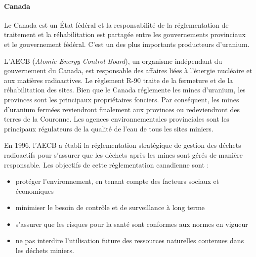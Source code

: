 \documentclass{article}
\begin{document}




\paragraph{Canada}

Le Canada est un État fédéral et la responsabilité de la réglementation de traitement et la réhabilitation est partagée entre les gouvernements provinciaux et le gouvernement fédéral.
C'est un des plus importants producteurs d'uranium.

L'AECB (\textit{Atomic Energy Control Board}), un organisme indépendant du gouvernement du Canada, est responsable des affaires liées à l'énergie nucléaire et aux matières radioactives. Le règlement R-90 traite de la fermeture et de la réhabilitation des sites. Bien que le Canada réglemente les mines d'uranium, les provinces sont les principaux propriétaires fonciers. Par conséquent, les mines d'uranium fermées reviendront finalement aux provinces ou redeviendront des terres de la Couronne. Les agences environnementales provinciales sont les principaux régulateurs de la qualité de l'eau de tous les sites miniers.

En 1996, l'AECB a établi la réglementation stratégique de gestion des déchets radioactifs pour s'assurer que les déchets après les mines sont gérés de manière responsable. Les objectifs de cette réglementation canadienne sont :
\begin{itemize}
    \item protéger l'environnement, en tenant compte des facteurs sociaux et économiques
    \item minimiser le besoin de contrôle et de surveillance à long terme
    \item s'assurer que les risques pour la santé sont conformes aux normes en vigueur 
    \item ne pas interdire l'utilisation future des ressources naturelles contenues dans les déchets miniers.
\end{itemize}
\end{document}
